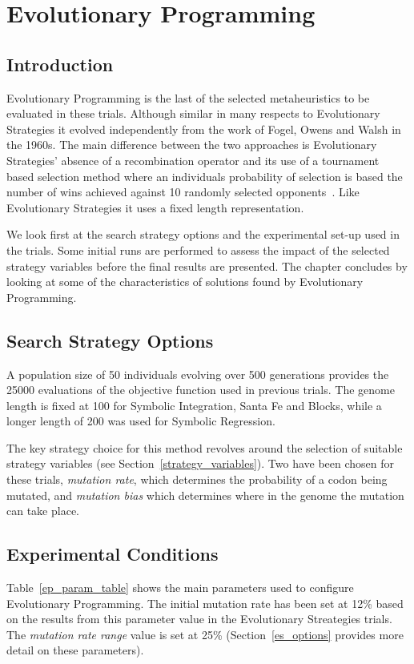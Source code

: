 \chapter{Evolutionary Programming}
\section{Introduction}
Evolutionary Programming is the last of the selected metaheuristics to be evaluated in these trials. Although similar in many respects to Evolutionary Strategies it evolved independently from the work of Fogel, Owens and Walsh in the 1960s. The main difference between the two approaches is Evolutionary Strategies' absence of a recombination operator and its use of a tournament based selection method where an individuals probability of selection is based the number of wins achieved against 10 randomly selected opponents~\cite{back}. Like Evolutionary Strategies it uses a fixed length representation.

We look first at the search strategy options and the experimental set-up used in the trials. Some initial runs are performed to assess the impact of the selected strategy variables before the final results are presented. The chapter concludes by looking at some of the characteristics of solutions found by Evolutionary Programming. 


\section{Search Strategy Options}
A population size of 50 individuals evolving over 500 generations provides the 25000 evaluations of the objective function  used in previous trials. The genome length is fixed at 100 for Symbolic Integration, Santa Fe and Blocks, while a longer length of 200 was used for Symbolic Regression.

The key strategy choice for this method revolves around the selection of suitable strategy variables (see Section~\ref{strategy_variables}). Two have been chosen for these trials, \emph{mutation rate}, which determines the probability of a codon being mutated, and \emph{mutation bias} which determines where in the genome the mutation can take place.  


\section{Experimental Conditions}
Table~\ref{ep_param_table} shows the main parameters used to configure Evolutionary Programming. The initial mutation rate has been set at 12\% based on the results from this parameter value in the Evolutionary Streategies trials. The \emph{mutation rate range} value is set at 25\% (Section~\ref{es_options} provides more detail on these parameters). 

